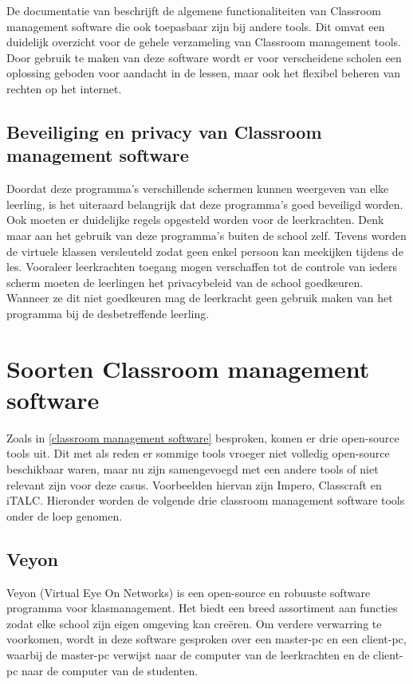 De documentatie van \textcite{veyonhome} beschrijft de algemene functionaliteiten van Classroom management software die ook toepasbaar zijn bij andere tools. Dit omvat een duidelijk overzicht voor de gehele verzameling van Classroom management tools. 
Door gebruik te maken van deze software wordt er voor verscheidene scholen een oplossing geboden voor aandacht in de lessen, maar ook het flexibel beheren van rechten op het internet. 

\subsection{Beveiliging en privacy van Classroom management software}
\label{beveiliging en privacy CMS}
Doordat deze programma's verschillende schermen kunnen weergeven van elke leerling, is het uiteraard belangrijk dat deze programma's goed beveiligd worden. Ook moeten er duidelijke regels opgesteld worden voor de leerkrachten. Denk maar aan het gebruik van deze programma's buiten de school zelf. Tevens worden de virtuele klassen versleuteld zodat geen enkel persoon kan meekijken tijdens de les. Vooraleer leerkrachten toegang mogen verschaffen tot de controle van ieders scherm moeten de leerlingen het privacybeleid van de school goedkeuren. Wanneer ze dit niet goedkeuren mag de leerkracht geen gebruik maken van het programma bij de desbetreffende leerling. \autocite{privacy}

\section{Soorten Classroom management software}
Zoals in \ref{classroom management software} besproken, komen er drie open-source tools uit. Dit met als reden er sommige tools vroeger niet volledig open-source beschikbaar waren, maar nu zijn samengevoegd met een andere tools of niet relevant zijn voor deze casus. Voorbeelden hiervan zijn Impero, Classcraft en iTALC.
Hieronder worden de volgende drie classroom management software tools onder de loep genomen. 

\subsection{Veyon}
Veyon (Virtual Eye On Networks) is een open-source en robuuste software programma voor klasmanagement. Het biedt een breed assortiment aan functies zodat elke school zijn eigen omgeving kan creëren. Om verdere verwarring te voorkomen, wordt in deze software gesproken over een master-pc en een client-pc, waarbij de master-pc verwijst naar de computer van de leerkrachten en de client-pc naar de computer van de studenten. 


